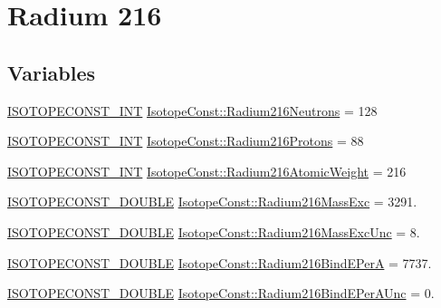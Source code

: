 \hypertarget{group___isotope_const-_radium-_ra216}{}\section{Radium 216}
\label{group___isotope_const-_radium-_ra216}
\subsection*{Variables}
\begin{DoxyCompactItemize}
\item 
\mbox{\hyperlink{group___isotope_const-_macros_ga5f18360b3e99483a35c32d789e62621c}{I\+S\+O\+T\+O\+P\+E\+C\+O\+N\+S\+T\+\_\+\+I\+NT}} \mbox{\hyperlink{group___isotope_const-_radium-_ra216_ga5f8b4047e00ee3621660389789e6e603}{Isotope\+Const\+::\+Radium216\+Neutrons}} = 128
\item 
\mbox{\hyperlink{group___isotope_const-_macros_ga5f18360b3e99483a35c32d789e62621c}{I\+S\+O\+T\+O\+P\+E\+C\+O\+N\+S\+T\+\_\+\+I\+NT}} \mbox{\hyperlink{group___isotope_const-_radium-_ra216_ga3c53264fd00ce20750a9ce19b7cc46cc}{Isotope\+Const\+::\+Radium216\+Protons}} = 88
\item 
\mbox{\hyperlink{group___isotope_const-_macros_ga5f18360b3e99483a35c32d789e62621c}{I\+S\+O\+T\+O\+P\+E\+C\+O\+N\+S\+T\+\_\+\+I\+NT}} \mbox{\hyperlink{group___isotope_const-_radium-_ra216_ga31459abb99e86f4a835b7d36a9424cff}{Isotope\+Const\+::\+Radium216\+Atomic\+Weight}} = 216
\item 
\mbox{\hyperlink{group___isotope_const-_macros_ga8f45a7272ce02c0b4c65c44636ed719a}{I\+S\+O\+T\+O\+P\+E\+C\+O\+N\+S\+T\+\_\+\+D\+O\+U\+B\+LE}} \mbox{\hyperlink{group___isotope_const-_radium-_ra216_gad852180fb0cc13284fb75e8c7b1cad8e}{Isotope\+Const\+::\+Radium216\+Mass\+Exc}} = 3291.
\item 
\mbox{\hyperlink{group___isotope_const-_macros_ga8f45a7272ce02c0b4c65c44636ed719a}{I\+S\+O\+T\+O\+P\+E\+C\+O\+N\+S\+T\+\_\+\+D\+O\+U\+B\+LE}} \mbox{\hyperlink{group___isotope_const-_radium-_ra216_gafe3164f246c672977c925dd6eee10877}{Isotope\+Const\+::\+Radium216\+Mass\+Exc\+Unc}} = 8.
\item 
\mbox{\hyperlink{group___isotope_const-_macros_ga8f45a7272ce02c0b4c65c44636ed719a}{I\+S\+O\+T\+O\+P\+E\+C\+O\+N\+S\+T\+\_\+\+D\+O\+U\+B\+LE}} \mbox{\hyperlink{group___isotope_const-_radium-_ra216_ga5ac595a0f039ce4a5fb41da1dbf74755}{Isotope\+Const\+::\+Radium216\+Bind\+E\+PerA}} = 7737.
\item 
\mbox{\hyperlink{group___isotope_const-_macros_ga8f45a7272ce02c0b4c65c44636ed719a}{I\+S\+O\+T\+O\+P\+E\+C\+O\+N\+S\+T\+\_\+\+D\+O\+U\+B\+LE}} \mbox{\hyperlink{group___isotope_const-_radium-_ra216_ga73d8b629ef23fc85c685a797df796364}{Isotope\+Const\+::\+Radium216\+Bind\+E\+Per\+A\+Unc}} = 0.

\end{DoxyCompactItemize}

